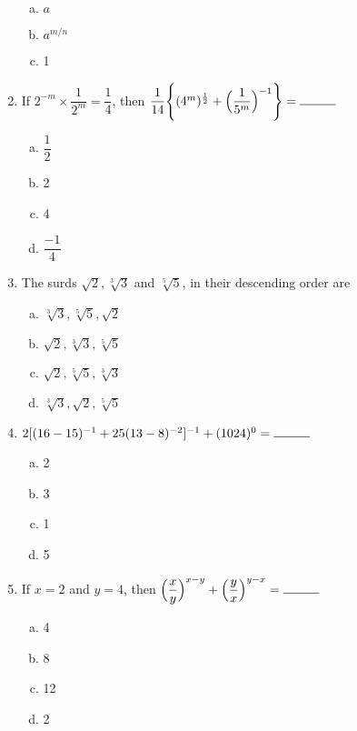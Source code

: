 \begin{multicols}{2}
\begin{enumerate}
\begin{multicols}{2}
\begin{enumerate}[(a)]
\item $a$
\item $a^{m/n}$
\item 1
\end{enumerate}
\end{multicols}
\item If $2^{-m}\times\dfrac{1}{2^m} = \dfrac{1}{4}$, then $\dfrac{1}{14}\Bigg\{(4^m)^{\frac{1}{2}}+\Big(\dfrac{1}{5^m}\Big)^{-1}\Bigg\} = \rule{1cm}{0.15mm}$
\begin{multicols}{2}
\begin{enumerate}[(a)]
\item $\dfrac{1}{2}$
\item 2
\item 4
\item $\dfrac{-1}{4} $
\end{enumerate}
\end{multicols}
\item The surds $\sqrt{2}, \sqrt[3]{3}$ and $\sqrt[5]{5}$, in their descending order are
\begin{multicols}{2}
\begin{enumerate}[(a)]
\item $\sqrt[3]{3},\sqrt[5]{5},\sqrt{2}$
\item $\sqrt{2},\sqrt[3]{3},\sqrt[5]{5}$
\item $\sqrt{2},\sqrt[5]{5},\sqrt[3]{3}$
\item $\sqrt[3]{3},\sqrt{2},\sqrt[5]{5}$
\end{enumerate}
\end{multicols}
\item $2[(16-15)^{-1}+25(13-8)^{-2}]^{-1}+(1024)^0 = \rule{1cm}{0.15mm}$
\begin{multicols}{2}
\begin{enumerate}[(a)]
\item 2
\item 3
\item 1
\item 5
\end{enumerate}
\end{multicols}
\item If $x = 2$ and $y = 4$, then $\Big(\dfrac{x}{y}\Big)^{x-y}+\Big(\dfrac{y}{x}\Big)^{y-x} = \rule{1cm}{0.15mm}$
\begin{multicols}{2}
\begin{enumerate}[(a)]
\item 4
\item 8
\item 12
\item 2

\end{enumerate}
\end{multicols}
\end{enumerate}
\end{multicols}
